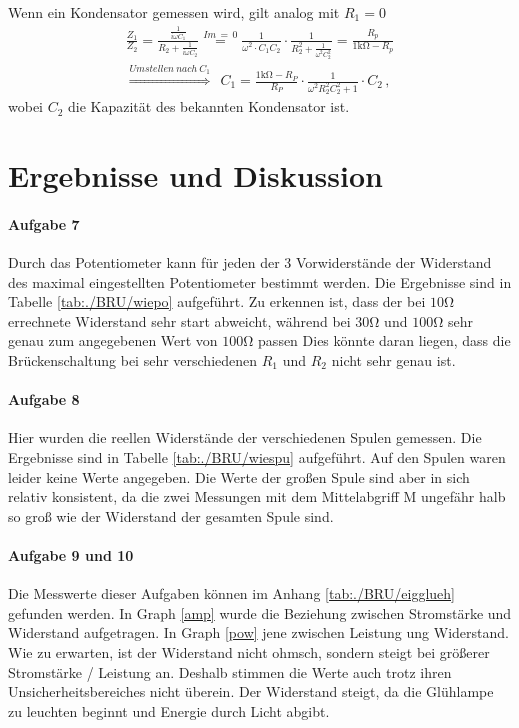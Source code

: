 \documentclass[11pt, a4paper]{article}
\begin{document}
    Wenn ein Kondensator gemessen wird, gilt analog mit $R_1 = 0$
    \begin{align}
        \frac{Z_1}{Z_2} = \frac{\frac{1}{i \omega C_1}}{R_2 + \frac{1}{i \omega C_2}} \overset{Im \, = \, 0}{=} \frac{1}{\omega^2 \cdot C_1 C_2} \cdot \frac{1}{R_2^2 + \frac{1}{\omega^2 C_2^2}} = \frac{R_p}{1\si{\kilo\ohm} - R_p} \\
        \overset{Umstellen \ nach \ C_1}{\Rightarrow} \ \ C_1 = \frac{1 \si{\kilo\ohm} - R_P}{R_P} \cdot \frac{1}{\omega^2 R_2^2 C_2^2 + 1}\cdot C_2 \,,
    \end{align}
    wobei $C_2$ die Kapazität des bekannten Kondensator ist.
    \section{Ergebnisse und Diskussion}
    \paragraph{Aufgabe 7}
    Durch das Potentiometer kann für jeden der 3 Vorwiderstände der Widerstand des maximal eingestellten Potentiometer bestimmt werden. Die Ergebnisse sind in Tabelle \ref{tab:./BRU/wiepo} aufgeführt. Zu erkennen ist, dass der bei $10 \si{\ohm}$ errechnete Widerstand sehr start abweicht, während bei $30 \si{\ohm}$ und $100 \si{\ohm}$ sehr genau zum angegebenen Wert von $100 \si{\ohm}$ passen Dies könnte daran liegen, dass die Brückenschaltung bei sehr verschiedenen $R_1$ und $R_2$ nicht sehr genau ist.
    

    \paragraph{Aufgabe 8}
    Hier wurden die reellen Widerstände der verschiedenen Spulen gemessen. Die Ergebnisse sind in Tabelle \ref{tab:./BRU/wiespu} aufgeführt. Auf den Spulen waren leider keine Werte angegeben. Die Werte der großen Spule sind aber in sich relativ konsistent, da die zwei Messungen mit dem Mittelabgriff M ungefähr halb so groß wie der Widerstand der gesamten Spule sind.

    

    \paragraph{Aufgabe 9 und 10}
    Die Messwerte dieser Aufgaben können im Anhang \ref{tab:./BRU/eigglueh} gefunden werden. In Graph \ref{amp} wurde die Beziehung zwischen Stromstärke und Widerstand aufgetragen. In Graph \ref{pow} jene zwischen Leistung ung Widerstand. Wie zu erwarten, ist der Widerstand nicht ohmsch, sondern steigt bei größerer Stromstärke / Leistung an. Deshalb stimmen die Werte auch trotz ihren Unsicherheitsbereiches nicht überein. Der Widerstand steigt, da die Glühlampe zu leuchten beginnt und Energie durch Licht abgibt.
\end{document}
